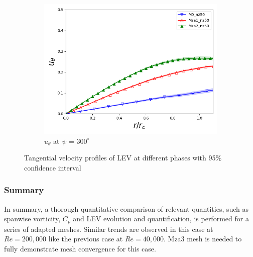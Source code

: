 \begin{figure}[H]
	\begin{subfigure}[b]{0.475\textwidth}
		\centering
		\includegraphics[width=1\textwidth]{figures/zonal_adapt_results/LEV_Re200k/u_theta/phase_300.png}
		\caption{ $u_\theta$ at $\psi$ = $300^\circ$}
		\label{fig:zonal_utheta_300_Re200k}
	\end{subfigure}
	\caption{Tangential velocity profiles of LEV at different phases with 95\% confidence interval}
	\label{fig:zonal_utheta_LEV_Re200k}
\end{figure}

\subsubsection{Summary}
In summary, a thorough quantitative comparison of relevant quantities, such as spanwise vorticity, $C_p$ and LEV evolution and quantification, is performed for a series of adapted meshes. Similar trends are observed in this case at $Re=200,000$ like the previous case at $Re=40,000$. Mza3 mesh is needed to fully demonstrate mesh convergence for this case.